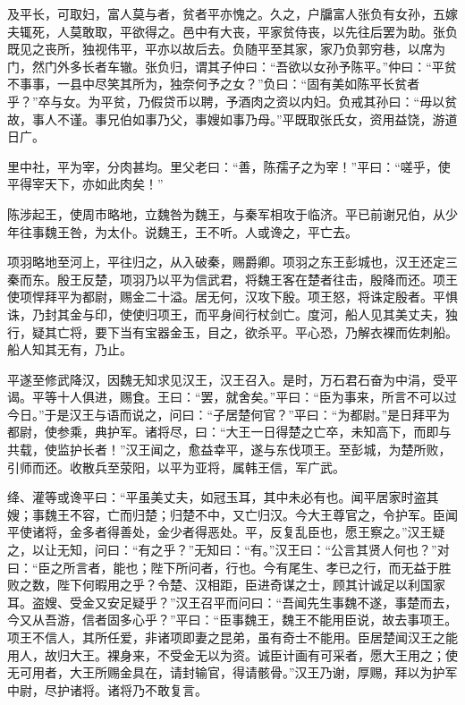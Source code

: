 \documentclass[12pt,UTF8]{ctexbook}
\begin{document}
及平长，可取妇，富人莫与者，贫者平亦愧之。久之，户牖富人张负有女孙，五嫁夫辄死，人莫敢取，平欲得之。邑中有大丧，平家贫侍丧，以先往后罢为助。张负既见之丧所，独视伟平，平亦以故后去。负随平至其家，家乃负郭穷巷，以席为门，然门外多长者车辙。张负归，谓其子仲曰：“吾欲以女孙予陈平。”仲曰：“平贫不事事，一县中尽笑其所为，独奈何予之女？”负曰：“固有美如陈平长贫者乎？”卒与女。为平贫，乃假贷币以聘，予酒肉之资以内妇。负戒其孙曰：“毋以贫故，事人不谨。事兄伯如事乃父，事嫂如事乃母。”平既取张氏女，资用益饶，游道日广。



里中社，平为宰，分肉甚均。里父老曰：“善，陈孺子之为宰！”平曰：“嗟乎，使平得宰天下，亦如此肉矣！”



陈涉起王，使周市略地，立魏咎为魏王，与秦军相攻于临济。平已前谢兄伯，从少年往事魏王咎，为太仆。说魏王，王不听。人或谗之，平亡去。



项羽略地至河上，平往归之，从入破秦，赐爵卿。项羽之东王彭城也，汉王还定三秦而东。殷王反楚，项羽乃以平为信武君，将魏王客在楚者往击，殷降而还。项王使项悍拜平为都尉，赐金二十溢。居无何，汉攻下殷。项王怒，将诛定殷者。平惧诛，乃封其金与印，使使归项王，而平身间行杖剑亡。度河，船人见其美丈夫，独行，疑其亡将，要下当有宝器金玉，目之，欲杀平。平心恐，乃解衣裸而佐刺船。船人知其无有，乃止。



平遂至修武降汉，因魏无知求见汉王，汉王召入。是时，万石君石奋为中涓，受平谒。平等十人俱进，赐食。王曰：“罢，就舍矣。”平曰：“臣为事来，所言不可以过今日。”于是汉王与语而说之，问曰：“子居楚何官？”平曰：“为都尉。”是日拜平为都尉，使参乘，典护军。诸将尽，曰：“大王一日得楚之亡卒，未知高下，而即与共载，使监护长者！”汉王闻之，愈益幸平，遂与东伐项王。至彭城，为楚所败，引师而还。收散兵至荥阳，以平为亚将，属韩王信，军广武。



绛、灌等或谗平曰：“平虽美丈夫，如冠玉耳，其中未必有也。闻平居家时盗其嫂；事魏王不容，亡而归楚；归楚不中，又亡归汉。今大王尊官之，令护军。臣闻平使诸将，金多者得善处，金少者得恶处。平，反复乱臣也，愿王察之。”汉王疑之，以让无知，问曰：“有之乎？”无知曰：“有。”汉王曰：“公言其贤人何也？”对曰：“臣之所言者，能也；陛下所问者，行也。今有尾生、孝已之行，而无益于胜败之数，陛下何暇用之乎？令楚、汉相距，臣进奇谋之士，顾其计诚足以利国家耳。盗嫂、受金又安足疑乎？”汉王召平而问曰：“吾闻先生事魏不遂，事楚而去，今又从吾游，信者固多心乎？”平曰：“臣事魏王，魏王不能用臣说，故去事项王。项王不信人，其所任爱，非诸项即妻之昆弟，虽有奇士不能用。臣居楚闻汉王之能用人，故归大王。裸身来，不受金无以为资。诚臣计画有可采者，愿大王用之；使无可用者，大王所赐金具在，请封输官，得请骸骨。”汉王乃谢，厚赐，拜以为护军中尉，尽护诸将。诸将乃不敢复言。
\end{document}
